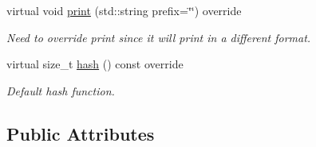 \begin{DoxyCompactItemize}
virtual void \hyperlink{class_grammar_hypothesis_a7b791d9da5ae86c52a42a2383c1c6bc0}{print} (std\+::string prefix=\char`\"{}\char`\"{}) override
\begin{DoxyCompactList}\small\item\em Need to override print since it will print in a different format. \end{DoxyCompactList}\item 
virtual size\+\_\+t \hyperlink{class_grammar_hypothesis_aeb9e858426a5ef273b87eafd8b2a5cd6}{hash} () const override
\begin{DoxyCompactList}\small\item\em Default hash function. \end{DoxyCompactList}\end{DoxyCompactItemize}
\subsection*{Public Attributes}
